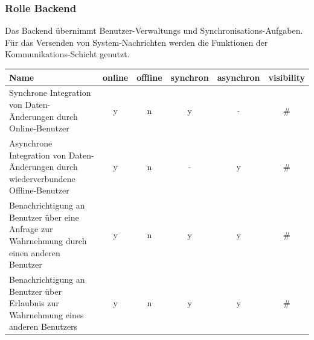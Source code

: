 \subsubsection{Rolle \textbf{Backend}}
Das Backend übernimmt Benutzer-Verwaltungs und Synchronisations-Aufgaben. Für das Versenden von System-Nachrichten werden die Funktionen der Kommunikations-Schicht genutzt.\\
	\begin{table}[H]
		\centering
		\begin{tabulary}{\columnwidth}{|L|C|C|C|C|C|}
		\hline
			\textbf{Name} & \textbf{online} & \textbf{offline} & \textbf{synchron} & \textbf{asynchron} & \textbf{visibility} \\ \hline
			Synchrone Integration von Daten-Änderungen durch Online-Benutzer & y & n & y & - & \# \\ \hline
			Asynchrone Integration von Daten-Änderungen durch wiederverbundene Offline-Benutzer & y & n & - & y & \# \\ \hline
			Benachrichtigung an Benutzer über eine Anfrage zur Wahrnehmung durch einen anderen Benutzer & y & n & y & y & \#  \\ \hline
			Benachrichtigung an Benutzer über Erlaubnis zur Wahrnehmung eines anderen Benutzers & y & n & y & y & \#  \\ \hline
		\end{tabulary}
	\end{table}

